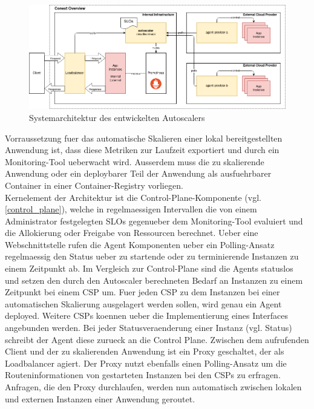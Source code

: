\documentclass[runningheads]{llncs}
\begin{document}
\begin{figure}[h]
	\centering
	\includegraphics[width=1.0\linewidth,scale=1.0]{images/context.png}
	\caption{Systemarchitektur des entwickelten Autoscalers}
	\label{systemarchitektur}
\end{figure}

Vorraussetzung fuer das automatische Skalieren einer lokal bereitgestellten Anwendung ist, dass diese Metriken zur Laufzeit exportiert und durch ein Monitoring-Tool ueberwacht wird. Ausserdem muss die zu skalierende Anwendung oder ein deploybarer Teil der Anwendung als ausfuehrbarer Container in einer Container-Registry vorliegen. \\

Kernelement der Architektur ist die Control-Plane-Komponente (vgl. \ref{control_plane}), welche in regelmaessigen Intervallen die von einem Administrator festgelegten SLOs gegenueber dem Monitoring-Tool evaluiert und die Allokierung oder Freigabe von Ressourcen berechnet. Ueber eine Webschnittstelle rufen die Agent Komponenten ueber ein Polling-Ansatz regelmaessig den Status ueber zu startende oder zu terminierende Instanzen zu einem Zeitpunkt ab. Im Vergleich zur Control-Plane sind die Agents statuslos und setzen den durch den Autoscaler berechneten Bedarf an Instanzen zu einem Zeitpunkt bei einem CSP um. Fuer jeden CSP zu dem Instanzen bei einer automatischen Skalierung ausgelagert werden sollen, wird genau ein Agent deployed. Weitere CSPs koennen ueber die Implementierung eines Interfaces angebunden werden. Bei jeder Statusveraenderung einer Instanz (vgl. Status) schreibt der Agent diese zurueck an die Control Plane. Zwischen dem aufrufenden Client und der zu skalierenden Anwendung ist ein Proxy geschaltet, der als Loadbalancer agiert. Der Proxy nutzt ebenfalls einen Polling-Ansatz um die Routeninformationen von gestarteten Instanzen bei den CSPs zu erfragen. Anfragen, die den Proxy durchlaufen, werden nun automatisch zwischen lokalen und externen Instanzen einer Anwendung geroutet.
\end{document}
